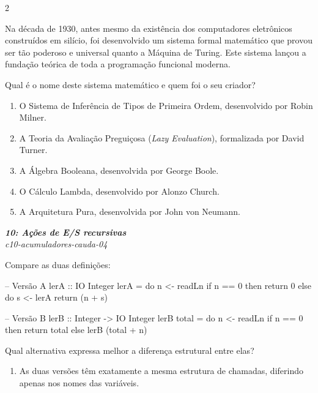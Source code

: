 \documentclass[a4paper,10pt,brazil]{article}
\begin{document}
\begin{multicols}{2}
\begin{flushright}
\end{flushright}
Na década de 1930, antes mesmo da existência dos computadores eletrônicos construídos em silício, foi desenvolvido um sistema formal matemático que provou ser tão poderoso e universal quanto a Máquina de Turing. Este sistema lançou a fundação teórica de toda a programação funcional moderna.

Qual é o nome deste sistema matemático e quem foi o seu criador?

\begin{enumerate}
  \item O Sistema de Inferência de Tipos de Primeira Ordem, desenvolvido por Robin Milner.

  \item A Teoria da Avaliação Preguiçosa (\emph{Lazy Evaluation}), formalizada por David Turner.

  \item A Álgebra Booleana, desenvolvida por George Boole.

  \item O Cálculo Lambda, desenvolvido por Alonzo Church.

  \item A Arquitetura Pura, desenvolvida por John von Neumann.


\end{enumerate}

\begin{flushright}
  \footnotesize
  \textit{\textbf{10: Ações de E/S recursivas}}\\
  \textit{c10-acumuladores-cauda-04}\\

\end{flushright}
Compare as duas definições:

\begin{haskellcode}
-- Versão A
lerA :: IO Integer
lerA = do
  n <- readLn
  if n == 0
    then return 0
    else do
      s <- lerA
      return (n + s)

-- Versão B
lerB :: Integer -> IO Integer
lerB total = do
  n <- readLn
  if n == 0
    then return total
    else lerB (total + n)
\end{haskellcode}

Qual alternativa expressa melhor a diferença estrutural entre elas?

\begin{enumerate}
  \item As duas versões têm exatamente a mesma estrutura de chamadas, diferindo apenas nos nomes das variáveis.


\end{enumerate}
\end{multicols}
\end{document}

